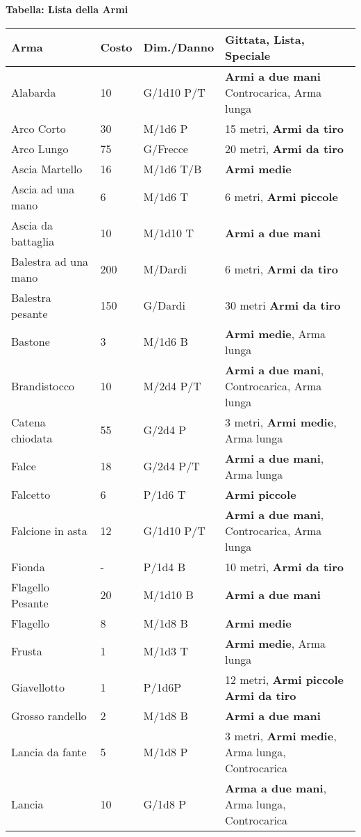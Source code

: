\documentclass[12pt,a4paper,twoside,openany]{book}
\begin{document}
\textbf{Tabella: Lista della Armi}

\begin{xltabular}{0.99\textwidth}{lllX}
\textbf{Arma}&\textbf{Costo}&\textbf{Dim./Danno} & \textbf{Gittata, Lista, Speciale}\\
\toprule
Alabarda& 10 & G/1d10 P/T& \textbf{Armi a due mani} Controcarica, Arma lunga \\
Arco Corto& 30 & M/1d6 P& 15 metri, \textbf{Armi da tiro}\\
Arco Lungo& 75 & G/Frecce& 20 metri, \textbf{Armi da tiro}\\
Ascia Martello& 16 & M/1d6 T/B& \textbf{Armi medie}\\
Ascia ad una mano& 6  & M/1d6 T& 6 metri, \textbf{Armi piccole}\\
Ascia da battaglia& 10 & M/1d10 T&\textbf{Armi a due mani}\\
Balestra ad una mano& 200& M/Dardi& 6 metri, \textbf{Armi da tiro}\\
Balestra pesante& 150 & G/Dardi& 30 metri \textbf{Armi da tiro}\\
Bastone& 3& M/1d6 B& \textbf{Armi medie}, Arma lunga\\
Brandistocco& 10 & M/2d4 P/T& \textbf{Armi a due mani}, Controcarica, Arma lunga\\
Catena chiodata& 55 & G/2d4 P& 3 metri, \textbf{Armi medie}, Arma lunga\\
Falce& 18 & G/2d4 P/T& \textbf{Armi a due mani}, Arma lunga\\
Falcetto& 6& P/1d6 T& \textbf{Armi piccole}\\
Falcione in asta& 12 & G/1d10 P/T& \textbf{Armi a due mani}, Controcarica, Arma lunga\\
Fionda& -& P/1d4 B& 10 metri, \textbf{Armi da tiro}\\
Flagello Pesante& 20 & M/1d10 B& \textbf{Armi a due mani}\\
Flagello& 8& M/1d8 B& \textbf{Armi medie}\\
Frusta& 1& M/1d3 T& \textbf{Armi medie}, Arma lunga\\
Giavellotto& 1& P/1d6P& 12 metri,  \textbf{Armi piccole} \textbf{Armi da tiro}\\
Grosso randello& 2& M/1d8 B&\textbf{Armi a due mani}\\
Lancia da fante& 5& M/1d8 P&3 metri, \textbf{Armi medie}, Arma lunga, Controcarica\\
Lancia& 10 & G/1d8 P&\textbf{Arma a due mani}, Arma lunga, Controcarica\\

\end{xltabular}
\end{document}
